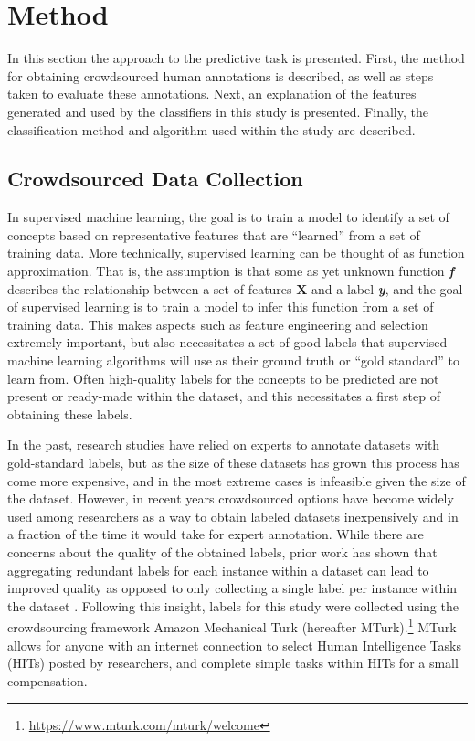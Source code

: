 \documentclass[twoside]{article}
\begin{document}
\section{Method} \label{sec:method}
In this section the approach to the predictive task is presented. First, the method for obtaining crowdsourced human annotations is described, as well as steps taken to evaluate these annotations. Next, an explanation of the features generated and used by the classifiers in this study is presented. Finally, the classification method and algorithm used within the study are described. 
\subsection{Crowdsourced Data Collection} \label{sec:crowdsource}
In supervised machine learning, the goal is to train a model to identify a set of concepts based on representative features that are ``learned'' from a set of training data. More technically, supervised learning can be thought of as function approximation. That is, the assumption is that some as yet unknown function \textbf{\emph{f}} describes the relationship between a set of features \textbf{X} and a label \textbf{\emph{y}}, and the goal of supervised learning is to train a model to infer this function from a set of training data. This makes aspects such as feature engineering and selection extremely important, but also necessitates a set of good labels that supervised machine learning algorithms will use as their ground truth or ``gold standard'' to learn from. Often high-quality labels for the concepts to be predicted are not present or ready-made within the dataset, and this necessitates a first step of obtaining these labels.
\par
In the past, research studies have relied on experts to annotate datasets with gold-standard labels, but as the size of these datasets has grown this process has come more expensive, and in the most extreme cases is infeasible given the size of the dataset. However, in recent years crowdsourced options have become widely used among researchers as a way to obtain labeled datasets inexpensively and in a fraction of the time it would take for expert annotation. While there are concerns about the quality of the obtained labels, prior work has shown that aggregating redundant labels for each instance within a dataset can lead to improved quality as opposed to only collecting a single label per instance within the dataset \cite{sheng2008get}. Following this insight, labels for this study were collected using the crowdsourcing framework Amazon Mechanical Turk (hereafter MTurk).\footnote{\url{https://www.mturk.com/mturk/welcome}} MTurk allows for anyone with an internet connection to select Human Intelligence Tasks (HITs) posted by researchers, and complete simple tasks within HITs for a small compensation. 
\end{document}

